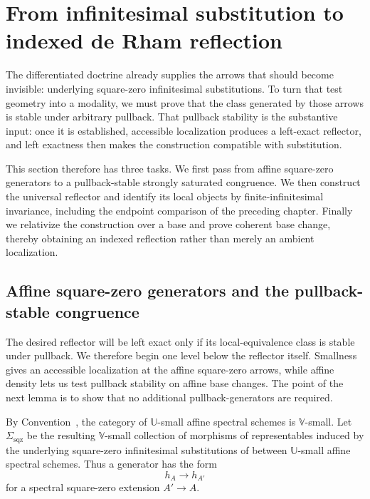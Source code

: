 \section{From infinitesimal substitution to indexed de Rham reflection}
\label{sec:de-Rham-reflective-doctrine}

The differentiated doctrine already supplies the arrows that should become
invisible: underlying square-zero infinitesimal substitutions. To turn that
test geometry into a modality, we must prove that the class generated by those
arrows is stable under arbitrary pullback. That pullback stability is the
substantive input: once it is established, accessible localization produces a
left-exact reflector, and left exactness then makes the construction compatible
with substitution.

This section therefore has three tasks. We first pass from affine square-zero
generators to a pullback-stable strongly saturated congruence. We then
construct the universal reflector and identify its local objects by
finite-infinitesimal invariance, including the endpoint comparison of the
preceding chapter. Finally we relativize the construction over a base and
prove coherent base change, thereby obtaining an indexed reflection rather
than merely an ambient localization.
\subsection{Affine square-zero generators and the pullback-stable congruence}
\label{sec:de-Rham-congruence}

The desired reflector will be left exact only if its local-equivalence class is
stable under pullback. We therefore begin one level below the reflector
itself. Smallness gives an accessible localization at the affine square-zero
arrows, while affine density lets us test pullback stability on affine base
changes. The point of the next lemma is to show that no additional
pullback-generators are required.

By Convention~, the category of
\(\mathbb U\)-small affine spectral schemes is \(\mathbb V\)-small. Let
\(\Sigma_{\mathrm{sqz}}\) be the resulting \(\mathbb V\)-small collection of
morphisms of representables induced by the underlying square-zero infinitesimal substitutions
of  between \(\mathbb U\)-small affine
spectral schemes. Thus a generator has the form
\[
  h_A\longrightarrow h_{A'}
\]
for a spectral square-zero extension \(A'\to A\).

